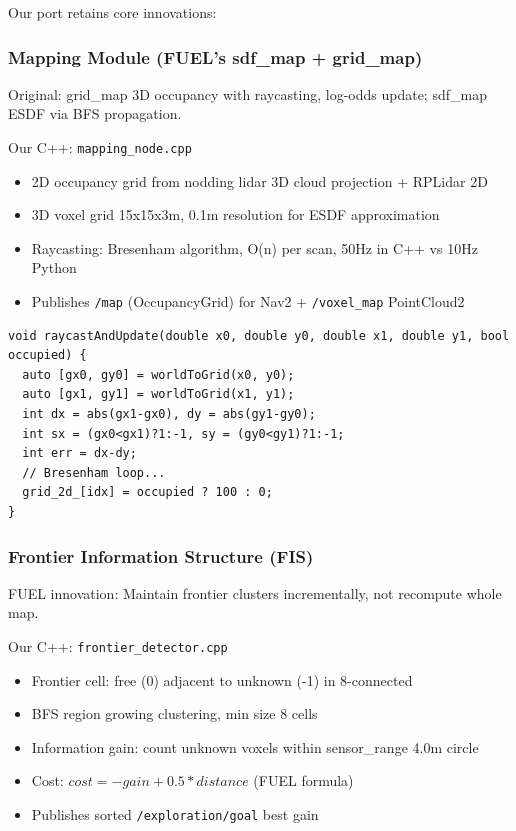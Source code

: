\documentclass[12pt,a4paper]{article}
\begin{document}
Our port retains core innovations:

\subsubsection{Mapping Module (FUEL's sdf\_map + grid\_map)}
Original: grid\_map 3D occupancy with raycasting, log-odds update; sdf\_map ESDF via BFS propagation.

Our C++: \texttt{mapping\_node.cpp}
\begin{itemize}
    \item 2D occupancy grid from nodding lidar 3D cloud projection + RPLidar 2D
    \item 3D voxel grid 15x15x3m, 0.1m resolution for ESDF approximation
    \item Raycasting: Bresenham algorithm, O(n) per scan, 50Hz in C++ vs 10Hz Python
    \item Publishes \texttt{/map} (OccupancyGrid) for Nav2 + \texttt{/voxel\_map} PointCloud2
\end{itemize}

\begin{lstlisting}[caption=C++ Raycasting]
void raycastAndUpdate(double x0, double y0, double x1, double y1, bool occupied) {
  auto [gx0, gy0] = worldToGrid(x0, y0);
  auto [gx1, gy1] = worldToGrid(x1, y1);
  int dx = abs(gx1-gx0), dy = abs(gy1-gy0);
  int sx = (gx0<gx1)?1:-1, sy = (gy0<gy1)?1:-1;
  int err = dx-dy;
  // Bresenham loop...
  grid_2d_[idx] = occupied ? 100 : 0;
}
\end{lstlisting}

\subsubsection{Frontier Information Structure (FIS)}
FUEL innovation: Maintain frontier clusters incrementally, not recompute whole map.

Our C++: \texttt{frontier\_detector.cpp}
\begin{itemize}
    \item Frontier cell: free (0) adjacent to unknown (-1) in 8-connected
    \item BFS region growing clustering, min size 8 cells
    \item Information gain: count unknown voxels within sensor\_range 4.0m circle
    \item Cost: $cost = -gain + 0.5 * distance$ (FUEL formula)
    \item Publishes sorted \texttt{/exploration/goal} best gain
\end{itemize}
\end{document}
